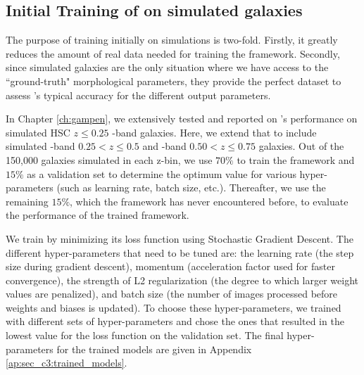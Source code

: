

\subsection{Initial Training of \gampen{} on simulated galaxies} \label{sec_c3:sim_training}
The purpose of training \gampen{} initially on simulations is two-fold. Firstly, it greatly reduces the amount of real data needed for training the framework. Secondly, since simulated galaxies are the only situation where we have access to the ``ground-truth" morphological parameters, they provide the perfect dataset to assess \gampen{}'s typical accuracy for the different output parameters. 

In Chapter \ref{ch:gampen}, we extensively tested and reported on \gampen{}'s performance on simulated HSC $z \leq 0.25$ \gb{}-band galaxies. Here, we extend that to include simulated \rb{}-band $0.25 < z \leq 0.5$ and \ib{}-band $0.50 < z \leq 0.75$  galaxies. Out of the 150,000 galaxies simulated in each z-bin, we use $70\%$ to train the framework and $15\%$ as a validation set to determine the optimum value for various hyper-parameters (such as learning rate, batch size, etc.). Thereafter, we use the remaining $15\%$, which the framework has never encountered before, to evaluate the performance of the trained framework. 

We train \gampen{} by minimizing its loss function using Stochastic Gradient Descent. The different hyper-parameters that need to be tuned are: the learning rate (the step size during gradient descent), momentum (acceleration factor used for faster convergence), the strength of L2 regularization (the degree to which larger weight values are penalized), and batch size (the number of images processed before weights and biases is updated). To choose these hyper-parameters, we trained \gampen{} with different sets of hyper-parameters and chose the ones that resulted in the lowest value for the loss function on the validation set. The final %
hyper-parameters for the trained models are given in Appendix \ref{ap:sec_c3:trained_models}.

